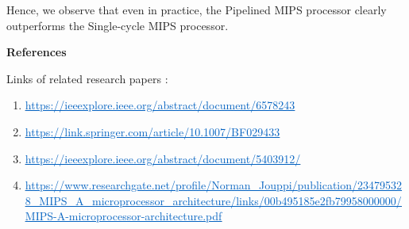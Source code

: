\documentclass[12pt]{article}
\begin{document}
{\fontsize{18pt}{21.6pt}\selectfont Hence, we observe that even in practice, the Pipelined MIPS processor clearly outperforms the Single-cycle MIPS processor. \par}\par


\vspace{\baselineskip}

\vspace{\baselineskip}

\vspace{\baselineskip}

\vspace{\baselineskip}

\vspace{\baselineskip}

\vspace{\baselineskip}

\vspace{\baselineskip}

\vspace{\baselineskip}
{\fontsize{22pt}{26.4pt}\selectfont \textbf{References}\par}\par


\vspace{\baselineskip}
{\fontsize{18pt}{21.6pt}\selectfont Links of related research papers :\par}\par


\vspace{\baselineskip}
\begin{enumerate}
	\item \href{https://ieeexplore.ieee.org/abstract/document/6578243}{\textcolor[HTML]{0563C1}{\uline{https://ieeexplore.ieee.org/abstract/document/6578243}}}\par
	
	\item \href{https://link.springer.com/article/10.1007/BF029433}{\textcolor[HTML]{0563C1}{\uline{https://link.springer.com/article/10.1007/BF029433}}}\par


	\item \href{https://ieeexplore.ieee.org/abstract/document/5403912/}{\textcolor[HTML]{0563C1}{\uline{https://ieeexplore.ieee.org/abstract/document/5403912/}}}\par	
	
	\item \href{https://www.researchgate.net/profile/Norman_Jouppi/publication/234795328_MIPS_A_microprocessor_architecture/links/00b495185e2fb79958000000/MIPS-A-microprocessor-architecture.pdf}{\textcolor[HTML]{0563C1}{\uline{https://www.researchgate.net/profile/Norman\_Jouppi/publication/234795328\_MIPS\_A\_microprocessor\_architecture/links/00b495185e2fb79958000000/MIPS-A-microprocessor-architecture.pdf}}}\par	

	
\end{enumerate}\par


\vspace{\baselineskip}

\printbibliography
\end{document}
